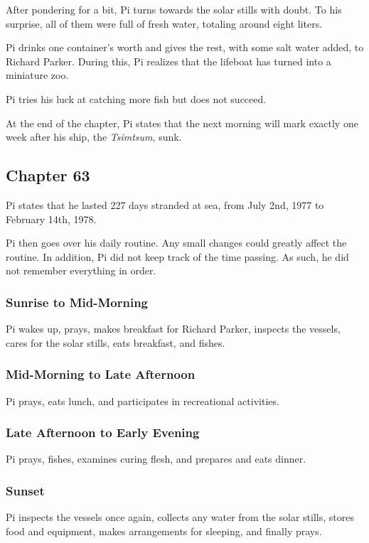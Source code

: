 \documentclass[11pt]{article}
\begin{document}
After pondering for a bit, Pi turns towards the solar stills with doubt. To his surprise, all of them were full of fresh water, totaling around eight liters.

Pi drinks one container's worth and gives the rest, with some salt water added, to Richard Parker. During this, Pi realizes that the lifeboat has turned into a miniature zoo.

Pi tries his luck at catching more fish but does not succeed.

At the end of the chapter, Pi states that the next morning will mark exactly one week after his ship, the \emph{Tsimtsum}, sunk.
\subsection{Chapter 63}
\label{sec:org39ad3e8}
Pi states that he lasted 227 days stranded at sea, from July 2nd, 1977 to February 14th, 1978.

Pi then goes over his daily routine. Any small changes could greatly affect the routine. In addition, Pi did not keep track of the time passing. As such, he did not remember everything in order.

\subsubsection{Sunrise to Mid-Morning}
\label{sec:orge4c245e}
Pi wakes up, prays, makes breakfast for Richard Parker, inspects the vessels, cares for the solar stills, eats breakfast, and fishes.

\subsubsection{Mid-Morning to Late Afternoon}
\label{sec:org5e66ccd}
Pi prays, eats lunch, and participates in recreational activities.

\subsubsection{Late Afternoon to Early Evening}
\label{sec:org8428c18}
Pi prays, fishes, examines curing flesh, and prepares and eats dinner.

\subsubsection{Sunset}
\label{sec:org5382a65}
Pi inspects the vessels once again, collects any water from the solar stills, stores food and equipment, makes arrangements for sleeping, and finally prays.
\end{document}
